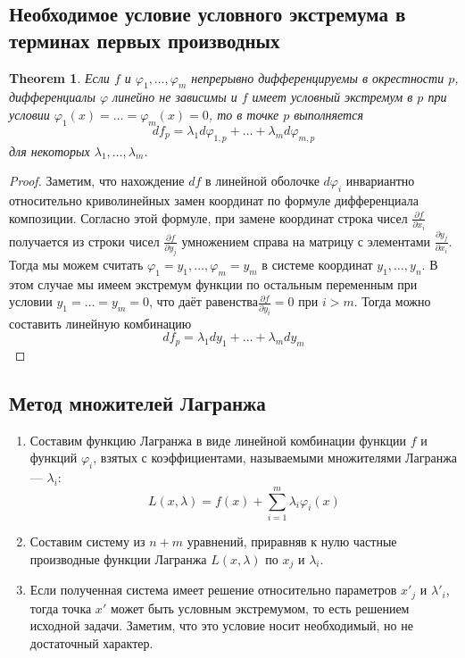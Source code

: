\documentclass[a4paper,12pt]{article} %
\newtheorem{theorem}{Theorem}
\theoremstyle{definition}
\begin{document}
\subsection{Необходимое условие условного экстремума в терминах первых производных}
\begin{theorem}
	Если $f$ и $\varphi_1, \dots, \varphi_m$ непрерывно дифференцируемы в окрестности $p$, дифференциалы $\varphi$ линейно не зависимы и $f$ имеет условный экстремум в $p$ при условии $\varphi_1(x) = \dots = \varphi_m(x) = 0$, то в точке $p$ выполняется
	\begin{equation}
		d f_p = \lambda_1 d \varphi_{1, p} + \dots + \lambda_m d \varphi_{m,p} 
	\end{equation}
	для некоторых $\lambda_1, \dots, \lambda_m$.
\end{theorem}
\begin{proof}
	Заметим, что нахождение $df$ в линейной оболочке $d\varphi_i$ инвариантно относительно криволинейных замен координат по формуле дифференциала композиции. Согласно этой формуле, при замене координат строка чисел $\frac{\partial f}{\partial x_i}$ получается из строки чисел $\frac{\partial f}{\partial y_j}$ умножением справа на матрицу с элементами $\frac{\partial y_j}{\partial x_i}$.\\
	Тогда мы можем считать $\varphi_1=y_1,\dots,\varphi_m=y_m$ в системе координат $y_1,\dots,y_n$. В этом случае мы имеем экстремум функции по остальным переменным при условии $y_1= \dots =y_m= 0$, что даёт равенства$\frac{\partial f}{\partial y_i}= 0$ при $i > m$. Тогда можно составить линейную комбинацию
	\begin{equation}
		d f_p = \lambda_1 d y_1 + \dots + \lambda_m d y_m
	\end{equation}
\end{proof}
\subsection{Метод множителей Лагранжа}
\begin{enumerate}
	\item Составим функцию Лагранжа в виде линейной комбинации функции $f $ и функций $\varphi_i$, взятых с коэффициентами, называемыми множителями Лагранжа --- $\lambda_i$:
	\begin{equation}
		L(x, \lambda) = f(x) + \sum_{i = 1}^m \lambda_i \varphi_i(x)
	\end{equation}
	\item Составим систему из $n + m$ уравнений, приравняв к нулю частные производные функции Лагранжа $L(x, \lambda)$ по $x_j$ и $\lambda_i$.
	\item Если полученная система имеет решение относительно параметров $x'_j$ и $\lambda'_i$, тогда точка $x'$ может быть условным экстремумом, то есть решением исходной задачи. Заметим, что это условие носит необходимый, но не достаточный характер.
\end{enumerate}
\end{document}
